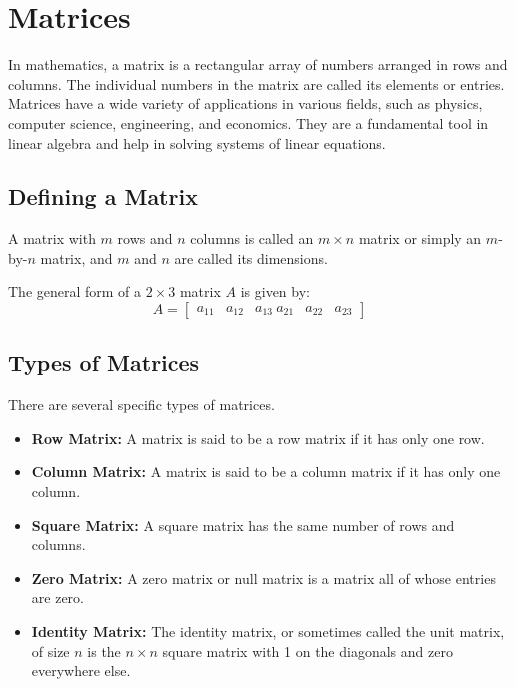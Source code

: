 \chapter{Matrices}

In mathematics, a matrix is a rectangular array of numbers arranged in rows and columns. The individual numbers in the matrix are called its elements or entries. Matrices have a wide variety of applications in various fields, such as physics, computer science, engineering, and economics. They are a fundamental tool in linear algebra and help in solving systems of linear equations.

\section{Defining a Matrix}
A matrix with $m$ rows and $n$ columns is called an $m \times n$ matrix or simply an $m$-by-$n$ matrix, and $m$ and $n$ are called its dimensions.

The general form of a $2 \times 3$ matrix $A$ is given by:
\begin{equation*}
A = \begin{bmatrix}
a_{11} & a_{12} & a_{13} \
a_{21} & a_{22} & a_{23}
\end{bmatrix}
\end{equation*}

\section{Types of Matrices}

There are several specific types of matrices.

\begin{itemize}
\item \textbf{Row Matrix:} A matrix is said to be a row matrix if it has only one row.
\item \textbf{Column Matrix:} A matrix is said to be a column matrix if it has only one column.
\item \textbf{Square Matrix:} A square matrix has the same number of rows and columns.
\item \textbf{Zero Matrix:} A zero matrix or null matrix is a matrix all of whose entries are zero.
\item \textbf{Identity Matrix:} The identity matrix, or sometimes called the unit matrix, of size $n$ is the $n \times n$ square matrix with 1 on the diagonals and zero everywhere else.
\end{itemize}